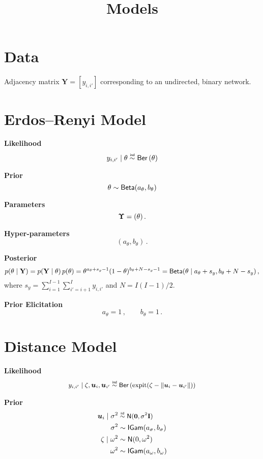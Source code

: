 \documentclass[letterpaper,12pt,openany]{article}
\DeclareMathOperator*{\expit}{expit}
\newcommand\simiid{\mathrel{\overset{\makebox[0pt]{\mbox{\normalfont\tiny\sffamily iid}}}{\sim}}}
\newcommand\simind{\mathrel{\overset{\makebox[0pt]{\mbox{\normalfont\tiny\sffamily ind}}}{\sim}}}
\def\Ber{\small{\mathsf{Ber}}}
\def\Nor{\small{\mathsf{N}}}
\def\Bet{\small{\mathsf{Beta}}}
\def\IGamd{\small{\mathsf{IGam}}}
\def\I{\mathbf{I}}\def\i{\mathbf{i}}\def\Iv{\boldsymbol{I}}\def\iv{\boldsymbol{i}}
\def\Y{\mathbf{Y}}\def\y{\mathbf{y}}\def\Yv{\boldsymbol{Y}}\def\yv{\boldsymbol{y}}
\def\sig{\sigma}\def\sigv{\boldsymbol{\sigma}}
\def\ome{\omega}
\def\zerov{\boldsymbol{0}}
\begin{document}
\title{Models}

\date{}

\maketitle

\section{Data}

Adjacency matrix $\Y = [y_{i,i'}]$ corresponding to an undirected, binary network.

\section{Erdos--Renyi Model}

\textbf{Likelihood}
$$
\begin{aligned}
y_{i,i'}\mid\theta \simind \Ber\left( \theta \right) 
\end{aligned}
$$

\textbf{Prior}
$$
\theta \sim \Bet(a_\theta, b_\theta)
$$

\textbf{Parameters} $$\mathbf{\Upsilon}= (\theta)\,.$$

\textbf{Hyper-parameters} $$(a_{\theta}, b_{\theta})\,.$$

\textbf{Posterior}
$$
p(\theta\mid\Y) = p(\Y\mid \theta)\,p(\theta) = 
\theta^{a_\theta + s_y -1}(1-\theta)^{b_\theta + N - s_y -1} =
\Bet(\theta\mid a_\theta + s_y, b_\theta + N - s_y)\,,
$$
where $s_y = \sum_{i=1}^{I-1}\sum_{i'=i+1}^I y_{i,i'}$ and $N = I(I-1)/2$. 

\textbf{Prior Elicitation}
$$
a_\theta = 1\,,\qquad b_\theta = 1\,.
$$

\section{Distance Model}

\textbf{Likelihood}
$$
\begin{aligned}
y_{i,i'}\mid\zeta,\uv_{i},\uv_{i'} \simind \Ber\left( \expit(\zeta - \|\uv_{i} - \uv_{i'}\| ) \right) 
\end{aligned}
$$

\textbf{Prior}
$$
\begin{aligned}
\uv_{i}\mid\sigma^2  & \simiid \Nor(\zerov,\sig^2\I) \\
\sigma^2             & \sim    \IGamd(a_{\sig}, b_{\sig})\\
\zeta\mid \ome^2     & \sim    \Nor(0,\ome^2) \\
\ome^2               & \sim    \IGamd(a_\ome, b_\ome)
\end{aligned}
$$
\end{document}
